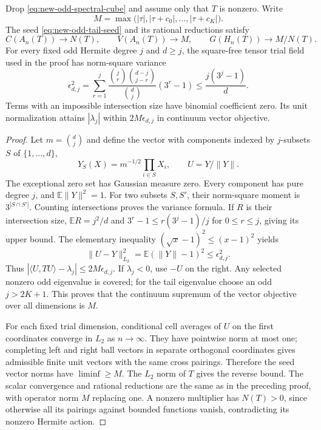 \begin{proposition}
\label{prop:new-general-vector-value}
Drop \eqref{eq:new-odd-spectral-cube} and assume only that $T$ is
nonzero.  Write
\[
 M=\max\bigl(|\tau|,|\tau+c_0|,\ldots,|\tau+c_K|\bigr).
\]
The seed \eqref{eq:new-odd-tail-seed} and its rational reductions satisfy
\[
 C(A_n(T))\to N(T),\qquad V(A_n(T))\to M,
                    \qquad G(H_n(T))\to M/N(T).
\]
For every fixed odd Hermite degree $j$ and $d\geq j$, the square-free
tensor trial field used in the proof has norm-square variance
\[
 \epsilon_{d,j}^2=
 \sum_{r=1}^j
 \frac{\binom jr\binom{d-j}{j-r}}{\binom dj}(3^r-1)
                  \leq\frac{j(3^j-1)}d.
\]
Terms with an impossible intersection size have binomial coefficient
zero.  Its unit normalization attains $|\lambda_j|$
within $2M\epsilon_{d,j}$ in continuum vector objective.
\end{proposition}
\begin{proof}
Let $m=\binom dj$ and define the vector with components indexed by
$j$-subsets $S$ of $\{1,\ldots,d\}$,
\[
 Y_S(X)=m^{-1/2}\prod_{i\in S}X_i,\qquad U=Y/\|Y\|.
\]
The exceptional zero set has Gaussian measure zero.  Every component
has pure degree $j$, and $\mathbb E\|Y\|^2=1$.  For two subsets
$S,S'$, their norm-square moment is $3^{|S\cap S'|}$.
Counting intersections proves the variance formula.  If $R$ is their
intersection size, $\mathbb ER=j^2/d$ and
$3^r-1\leq r(3^j-1)/j$ for $0\leq r\leq j$, giving its upper bound.
The elementary inequality $(\sqrt{x}-1)^2\leq(x-1)^2$ yields
\[
 \|U-Y\|_{L_2}^2=\mathbb E(\|Y\|-1)^2
                   \leq\epsilon_{d,j}^2.
\]
Thus
$|\langle U,TU\rangle-\lambda_j|\leq2M\epsilon_{d,j}$.
If $\lambda_j<0$, use $-U$ on the right.  Any selected nonzero odd
eigenvalue is covered; for the tail eigenvalue choose an odd
$j>2K+1$.  This proves that the continuum supremum of the vector
objective over all dimensions is $M$.

For each fixed trial dimension, conditional cell averages of $U$
on the first coordinates converge in $L_2$ as $n\to\infty$.
They have pointwise norm at most one; completing left and right
ball vectors in separate orthogonal coordinates gives admissible
finite unit vectors with the same cross pairings.  Therefore the
seed vector norms have $\liminf\geq M$.  The $L_2$ norm of $T$ gives
the reverse bound.  The scalar convergence and rational reductions
are the same as in the preceding proof, with operator norm $M$
replacing one.  A nonzero multiplier has $N(T)>0$, since otherwise
all its pairings against bounded functions vanish, contradicting its
nonzero Hermite action.
\end{proof}

